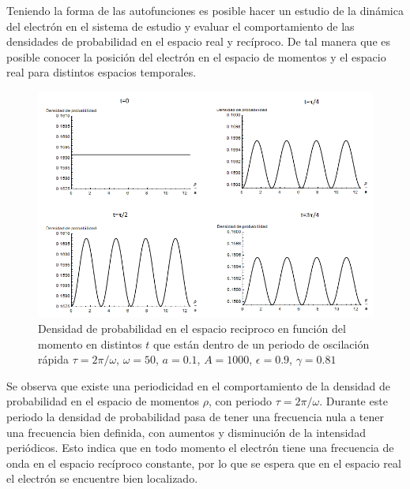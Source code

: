 \normalsize
Teniendo la forma de las autofunciones es posible hacer un estudio de la dinámica del electrón en el sistema de estudio y evaluar el comportamiento de las densidades de probabilidad en el espacio real y recíproco. De tal manera que es posible conocer la posición del electrón en el espacio de momentos y el espacio real para distintos espacios temporales. 

\begin{figure}[H]
    \centering
    \includegraphics[width=1\columnwidth]{imagenes/dens_prop_pt0.png}
    \caption{Densidad de probabilidad en el espacio reciproco en función del momento en distintos $t$ que están dentro de un periodo de oscilación rápida $\tau=2\pi/\omega$, $\omega=50$, $a=0.1$, $A=1000$, $\epsilon=0.9$, $\gamma=0.81$}
    \label{fig5.11}
\end{figure}

Se observa que existe una periodicidad en el comportamiento de la densidad de probabilidad en el espacio de momentos $\rho$, con periodo $\tau=2\pi/\omega$. Durante este periodo la densidad de probabilidad pasa de tener una frecuencia nula a tener una frecuencia bien definida, con aumentos y disminución de la intensidad periódicos. Esto indica que en todo momento el electrón tiene una frecuencia de onda en el espacio recíproco constante, por lo que se espera que en el espacio real el electrón se encuentre bien localizado. 

